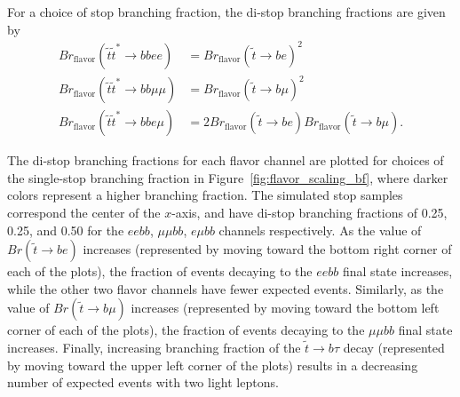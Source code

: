For a choice of stop branching fraction, the di-stop branching fractions are
given by 
\begin{equation}
  \label{eqn:branching_fractions}
  \begin{aligned}
    Br_\mathrm{flavor}(\tilde{t}\tilde{t}^{*} \rightarrow bbee)     &=
      Br_\mathrm{flavor}(\tilde{t} \rightarrow be )^{2} \\
    Br_\mathrm{flavor}(\tilde{t}\tilde{t}^{*} \rightarrow bb\mu\mu) &=
      Br_\mathrm{flavor}(\tilde{t} \rightarrow b\mu )^{2} \\
    Br_\mathrm{flavor}(\tilde{t}\tilde{t}^{*} \rightarrow bbe\mu)   &=
      2Br_\mathrm{flavor}(\tilde{t} \rightarrow be )
      Br_\mathrm{flavor}(\tilde{t} \rightarrow b\mu ).
  \end{aligned}
\end{equation}

The di-stop branching fractions for each flavor channel are plotted for choices
of the single-stop branching fraction in Figure~\ref{fig:flavor_scaling_bf},
where darker colors represent a higher branching fraction.
The simulated stop samples correspond the center of the $x$-axis, and have
di-stop branching fractions of 0.25, 0.25, and 0.50 for the $eebb$,
$\mu\mu bb$, $e\mu bb$ channels respectively.
As the value of $Br(\tilde{t} \to be)$ increases (represented by moving toward
the bottom right corner of each of the plots), the fraction of events decaying
to the $eebb$ final state increases, while the other two flavor channels
have fewer expected events.
Similarly, as the value of $Br(\tilde{t} \to b\mu)$ increases (represented by
moving toward the bottom left corner of each of the plots), the fraction of
events decaying to the $\mu\mu bb$ final state increases.
Finally, increasing branching fraction of the $\tilde{t} \to b\tau$ decay
(represented by moving toward the upper left corner of the plots) results in a
decreasing number of expected events with two light leptons.

